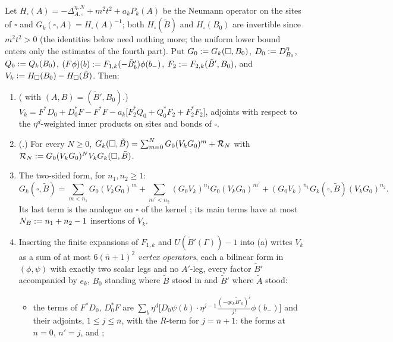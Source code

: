 \begin{lemma}\label{sup3:lem:S142}
Let $H_\square(A)=-\Delta^{\eta,N}_{A,\square}+m^2t^2+a_kP_k(A)$ be the Neumann operator on the sites of $\square$ and $G_k(\square,A)=H_\square(A)^{-1}$; both $H_\square(\tilde B)$ and $H_\square(B_0)$ are invertible since $m^2t^2>0$ (the identities below need nothing more; the uniform lower bound \cite[(1.8)]{Ba4} enters only the estimates of the fourth part). Put $G_0:= G_k(\square,B_0)$, $D_0:= D^\eta_{B_0}$, $Q_0:= Q_k(B_0)$, $(F\phi)(b):= F_{1,k}(-\tilde B'_b)\phi(b_-)$, $F_2:= F_{2,k}(\tilde B',B_0)$, and $V_k:= H_\square(B_0)-H_\square(\tilde B)$. Then:
\begin{enumerate}[label=\textup{(\alph*)},nosep,leftmargin=*]
\item (\cite[(3.44)]{Ba1} with $(A,B)=(\tilde B',B_0)$.) $V_k=F^*D_0+D_0^*F-F^*F-a_k\big[F_2^*Q_0+Q_0^*F_2+F_2^*F_2\big]$, adjoints with respect to the $\eta^d$-weighted inner products on sites and bonds of $\square$.
\item (\cite[(3.45)]{Ba1}.) For every $N\ge0$, $G_k(\square,\tilde B)=\sum_{m=0}^{N}G_0(V_kG_0)^m+\mathcal R_N$ with $\mathcal R_N:= G_0(V_kG_0)^NV_kG_k(\square,\tilde B)$.
\item[\textup{(b$'$)}] The two-sided form, for $n_1,n_2\ge1$:
\[
G_k(\square,\tilde B)=\sum_{m<n_1}G_0(V_kG_0)^m+\sum_{m'<n_2}(G_0V_k)^{n_1}G_0(V_kG_0)^{m'}+(G_0V_k)^{n_1}G_k(\square,\tilde B)(V_kG_0)^{n_2}.
\]
Its last term is the analogue on $\square$ of the kernel \cite[(1.16)]{Ba3}; its main terms have at most $N_B:= n_1+n_2-1$ insertions of $V_k$.
\item Inserting the finite expansions of $F_{1,k}$ and $U(\tilde B'(\Gamma))-1$ into (a) writes $V_k$ as a sum of at most $6(\bar n+1)^2$ \emph{vertex operators}, each a bilinear form in $(\phi,\psi)$ with exactly two scalar legs and no $A'$-leg, every factor $\tilde B'$ accompanied by $e_k$, $B_0$ standing where $\tilde B$ stood in \cite[(1.8)--(1.15)]{Ba3} and $\tilde B'$ where $\tilde A$ stood:
\begin{itemize}[nosep,leftmargin=*]
\item the terms of $F^*D_0$, $D_0^*F$ are $\sum_b\eta^d\big[D_0\psi(b)\cdot\eta^{j-1}\tfrac{(-qe_k\tilde B'_b)^j}{j!}\phi(b_-)\big]$ and their adjoints, $1\le j\le\bar n$, with the $R$-term for $j=\bar n+1$: the forms \cite[(1.8)]{Ba3} at $n=0$, $n'=j$, and \cite[(1.9)]{Ba3};

\end{itemize}
\end{enumerate}
\end{lemma}
